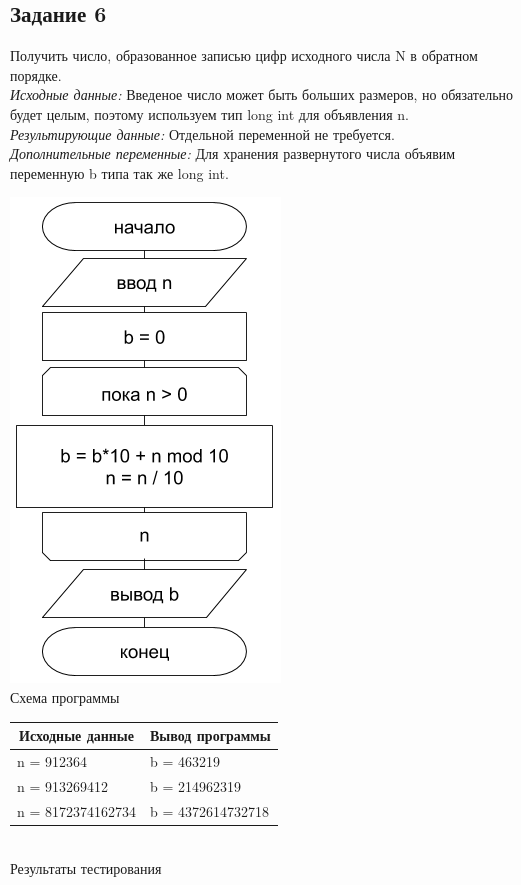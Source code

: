 \documentclass[a4paper,14pt]{extarticle}
\begin{document}
\subsection{Задание 6}
Получить число, образованное записью цифр исходного числа N в обратном порядке.\\
\textit{Исходные данные:} Введеное число может быть больших размеров, но обязательно будет целым, поэтому используем тип long int для объявления n.\\
\textit{Результирующие данные:} Отдельной переменной не требуется.\\
\textit{Дополнительные переменные:} Для хранения развернутого числа объявим переменную b типа так же long int.\\
\begin{center}
\includegraphics[scale=0.6]{lab2-6.png}\\
Схема программы
\end{center}

\begin{center}
\begin{tabular}{|l|l|}
\hline
\multicolumn{1}{|c|}{Исходные данные}& \multicolumn{1}{|c|}{Вывод программы}\\
\hline
n = 912364 & b = 463219\\
n = 913269412 & b = 214962319\\
n = 8172374162734 & b = 4372614732718\\
\hline
\end{tabular}\\
\vspace{0.3cm}
Результаты тестирования
\end{center}
\end{document}
